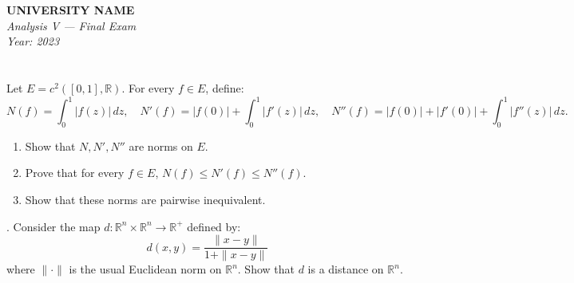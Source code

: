 \documentclass[12pt]{article}
\begin{document}
\begin{center}
  \Large\textbf{UNIVERSITY NAME} \\[1em]
  \large\textit{Analysis V — Final Exam} \\[0.5em]
  \large\textit{Year: 2023} \\[2em]
\end{center}

\vspace{0.5cm}

\section{}
Let \( E = c^2([0, 1], \mathbb{R}) \). For every \( f \in E \), define:
\[
N(f) = \int_0^1 |f(z)| \, dz, \quad N'(f) = |f(0)| + \int_0^1 |f'(z)| \, dz, \quad N''(f) = |f(0)| + |f'(0)| + \int_0^1 |f''(z)| \, dz.
\]
\begin{enumerate}
    \item[(a)] Show that \( N, N', N'' \) are norms on \( E \).
    \item[(b)] Prove that for every \( f \in E \), \( N(f) \leq N'(f) \leq N''(f) \).
    \item[(c)] Show that these norms are pairwise inequivalent.
\end{enumerate}

. Consider the map \( d : \mathbb{R}^n \times \mathbb{R}^n \to \mathbb{R}^+ \) defined by:
\[
d(x, y) = \frac{\|x - y\|}{1 + \|x - y\|}
\]
where \( \|\cdot\| \) is the usual Euclidean norm on \( \mathbb{R}^n \). Show that \( d \) is a distance on \( \mathbb{R}^n \).
\end{document}
